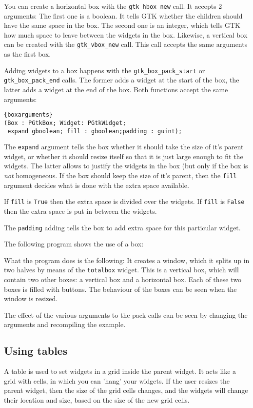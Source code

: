 \documentclass[10pt]{article}
\begin{document}
You can create a horizontal box with the \lstinline|gtk_hbox_new| call. 
It accepts 2 arguments: The first one is a boolean. It tells GTK whether the
children should have the same space in the box. The second one is an
integer, which tells GTK how much space to leave between the widgets in the
box. Likewise, a vertical box can be created with the
\lstinline|gtk_vbox_new| call. This call accepts the same arguments as the
first box.

Adding widgets to a box happens with the \lstinline|gtk_box_pack_start| or
\lstinline|gtk_box_pack_end| calls. The former adds a widget at the start
of the box, the latter adds a widget at the end of the box. Both functions
accept the same arguments:
\begin{lstlisting}{boxarguments}
(Box : PGtkBox; Widget: PGtkWidget;
 expand gboolean; fill : gboolean;padding : guint);
\end{lstlisting}
The \lstinline|expand| argument tells the box whether it should take the
size of it's parent widget, or whether it should resize itself so that it is
just large enough to fit the widgets. The latter allows to justify the
widgets in the box (but only if the box is {\em not} homogeneous.  
If the box should keep the size of it's parent, then the \lstinline|fill| 
argument decides what is done with the extra space available. 

If \lstinline|fill| is \lstinline|True| then the extra space is
divided over the widgets. If \lstinline|fill| is \lstinline|False| then the
extra space is put in between the widgets. 

The \lstinline|padding| adding tells the box to add extra space for this 
particular widget.

The following program shows the use of a box:

What the program does is the following: It creates a window, which it splits
up in two halves by means of the \lstinline|totalbox| widget. This is a
vertical box, which will contain two other boxes: a vertical box and a
horizontal box. Each of these two boxes is filled with buttons.
The behaviour of the boxes can be seen when the window is resized.

The effect of the various arguments to the pack calls can be seen by
changing the arguments and recompiling the example.

\subsection{Using tables}
A table is used to set widgets in a grid inside the parent widget. It acts
like a grid with cells, in which you can 'hang' your widgets. If the user 
resizes the parent widget, then the size of the grid cells changes, and 
the widgets will change their location and size, based on the size of the 
new grid cells. 
\end{document}
